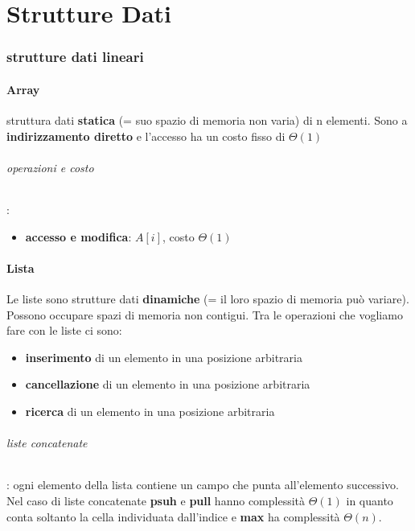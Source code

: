 \documentclass{article}
\begin{document}
\part{Strutture Dati}
\section{strutture dati lineari} %
\subsection{Array} %
struttura dati \textbf{statica} (= suo spazio di memoria non varia) di n elementi. 
Sono a \textbf{indirizzamento diretto} e l'accesso ha un costo fisso di $\Theta (1)$
\paragraph{operazioni e costo}:
\begin{itemize}
    \item \textbf{accesso e modifica}: $A[i]$, costo $\Theta(1)$
\end{itemize}

\subsection{Lista} %
Le liste sono strutture dati \textbf{dinamiche} (= il loro spazio di memoria può variare). 
Possono occupare spazi di
 memoria non contigui. Tra le operazioni che vogliamo fare con le liste ci sono:
 \begin{itemize}
    \item \textbf{inserimento} di un elemento in una posizione arbitraria
    \item \textbf{cancellazione} di un elemento in una posizione arbitraria
    \item \textbf{ricerca} di un elemento in una posizione arbitraria
 \end{itemize}
 
 \paragraph{liste concatenate}: ogni elemento della lista contiene un campo che punta all'elemento successivo.
 Nel caso di liste concatenate \textbf{psuh}
e \textbf{pull} hanno complessità $\Theta(1)$ in quanto conta soltanto la cella individuata dall'indice
 e \textbf{max} ha complessità $\Theta(n)$.
 
\end{document}
